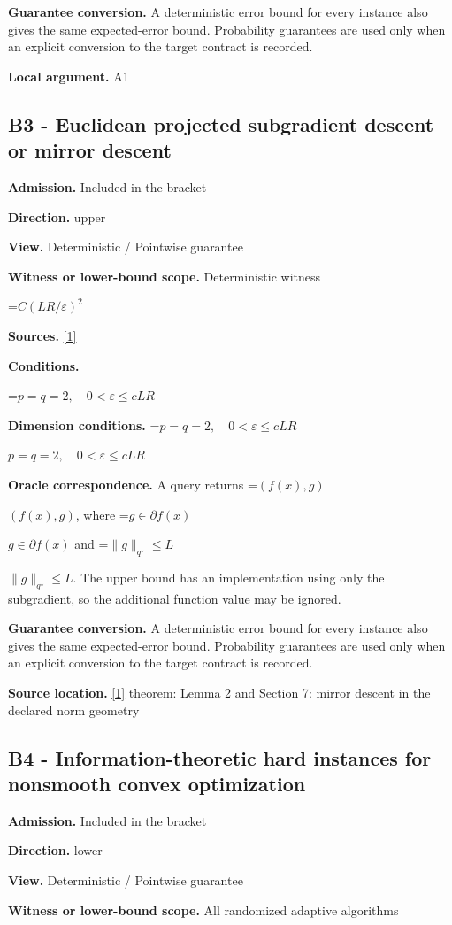 \documentclass[10pt,a4paper]{article}
\newcommand{\AtlasMath}[1]{\par\begingroup\centering\setbox0=\hbox{$\displaystyle #1$}\ifdim\wd0>1.4\linewidth\typeout{ATLAS WIDE FORMULA: \the\wd0}\fi\ifdim\wd0>\linewidth\resizebox{\linewidth}{!}{\box0}\else\box0\fi\par\endgroup}
\newcommand{\AtlasInlineMath}[1]{\begingroup\setbox0=\hbox{$#1$}\ifdim\wd0>.4\linewidth\endgroup\AtlasMath{#1}\else\endgroup$#1$\fi}
\begin{document}
\textbf{Guarantee conversion.} A deterministic error bound for every instance also gives the same expected-error bound. Probability guarantees are used only when an explicit conversion to the target contract is recorded.

\textbf{Local argument.} A1

\subsection{B3 - Euclidean projected subgradient descent or mirror descent}
\textbf{Admission.} Included in the bracket

\textbf{Direction.} upper

\textbf{View.} Deterministic / Pointwise guarantee

\textbf{Witness or lower-bound scope.} Deterministic witness

\AtlasMath{C(LR/\varepsilon)^2}
\textbf{Sources.} \href{https://arxiv.org/pdf/1107.4080}{[1]}

\textbf{Conditions.} 
\AtlasMath{p=q=2,\quad0<\varepsilon\le cLR}


\textbf{Dimension conditions.} \AtlasInlineMath{p=q=2,\quad0<\varepsilon\le cLR}

\textbf{Oracle correspondence.} A query returns \AtlasInlineMath{(f(x),g)}, where \AtlasInlineMath{g\in\partial f(x)} and \AtlasInlineMath{\|g\|_{q^\star}\le L}. The upper bound has an implementation using only the subgradient, so the additional function value may be ignored.

\textbf{Guarantee conversion.} A deterministic error bound for every instance also gives the same expected-error bound. Probability guarantees are used only when an explicit conversion to the target contract is recorded.

\textbf{Source location.} \href{https://arxiv.org/pdf/1107.4080}{[1]} theorem: Lemma 2 and Section 7: mirror descent in the declared norm geometry

\subsection{B4 - Information-theoretic hard instances for nonsmooth convex optimization}
\textbf{Admission.} Included in the bracket

\textbf{Direction.} lower

\textbf{View.} Deterministic / Pointwise guarantee

\textbf{Witness or lower-bound scope.} All randomized adaptive algorithms
\end{document}
